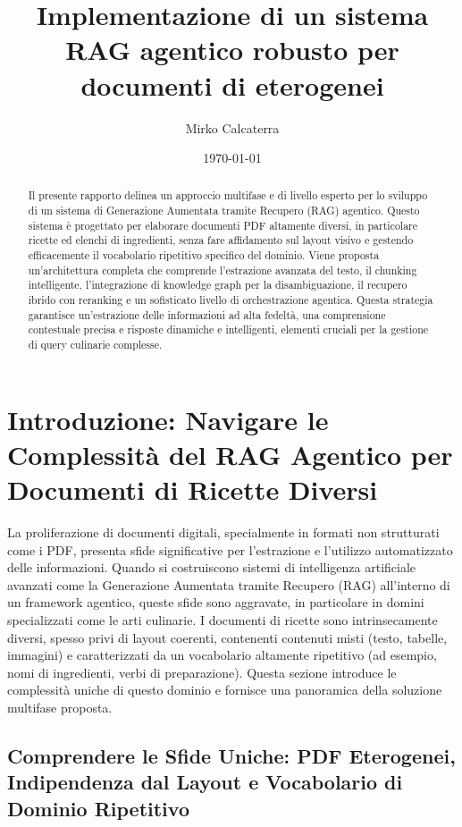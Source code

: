 \documentclass[a4paper, 11pt]{article}
\title{Implementazione di un sistema RAG agentico robusto per documenti di eterogenei}
\author{Mirko Calcaterra}
\date{\today}
\begin{document}
\maketitle
\thispagestyle{empty}
\clearpage

\begin{abstract}
\noindent Il presente rapporto delinea un approccio multifase e di livello esperto per lo sviluppo di un sistema di Generazione Aumentata tramite Recupero (RAG) agentico. Questo sistema è progettato per elaborare documenti PDF altamente diversi, in particolare ricette ed elenchi di ingredienti, senza fare affidamento sul layout visivo e gestendo efficacemente il vocabolario ripetitivo specifico del dominio. Viene proposta un'architettura completa che comprende l'estrazione avanzata del testo, il chunking intelligente, l'integrazione di knowledge graph per la disambiguazione, il recupero ibrido con reranking e un sofisticato livello di orchestrazione agentica. Questa strategia garantisce un'estrazione delle informazioni ad alta fedeltà, una comprensione contestuale precisa e risposte dinamiche e intelligenti, elementi cruciali per la gestione di query culinarie complesse.
\end{abstract}

\tableofcontents
\clearpage

\section{Introduzione: Navigare le Complessità del RAG Agentico per Documenti di Ricette Diversi}

La proliferazione di documenti digitali, specialmente in formati non strutturati come i PDF, presenta sfide significative per l'estrazione e l'utilizzo automatizzato delle informazioni. Quando si costruiscono sistemi di intelligenza artificiale avanzati come la Generazione Aumentata tramite Recupero (RAG) all'interno di un framework agentico, queste sfide sono aggravate, in particolare in domini specializzati come le arti culinarie. I documenti di ricette sono intrinsecamente diversi, spesso privi di layout coerenti, contenenti contenuti misti (testo, tabelle, immagini) e caratterizzati da un vocabolario altamente ripetitivo (ad esempio, nomi di ingredienti, verbi di preparazione). Questa sezione introduce le complessità uniche di questo dominio e fornisce una panoramica della soluzione multifase proposta.

\subsection{Comprendere le Sfide Uniche: PDF Eterogenei, Indipendenza dal Layout e Vocabolario di Dominio Ripetitivo}
\end{document}
